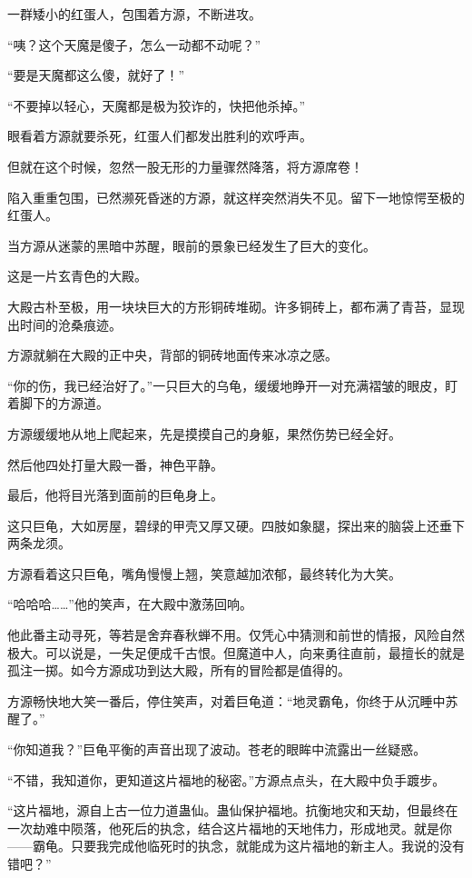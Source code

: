
\begin{this_body}

一群矮小的红蛋人，包围着方源，不断进攻。

“咦？这个天魔是傻子，怎么一动都不动呢？”

“要是天魔都这么傻，就好了！”

“不要掉以轻心，天魔都是极为狡诈的，快把他杀掉。”

眼看着方源就要杀死，红蛋人们都发出胜利的欢呼声。

但就在这个时候，忽然一股无形的力量骤然降落，将方源席卷！

陷入重重包围，已然濒死昏迷的方源，就这样突然消失不见。留下一地惊愕至极的红蛋人。

当方源从迷蒙的黑暗中苏醒，眼前的景象已经发生了巨大的变化。

这是一片玄青色的大殿。

大殿古朴至极，用一块块巨大的方形铜砖堆砌。许多铜砖上，都布满了青苔，显现出时间的沧桑痕迹。

方源就躺在大殿的正中央，背部的铜砖地面传来冰凉之感。

“你的伤，我已经治好了。”一只巨大的乌龟，缓缓地睁开一对充满褶皱的眼皮，盯着脚下的方源道。

方源缓缓地从地上爬起来，先是摸摸自己的身躯，果然伤势已经全好。

然后他四处打量大殿一番，神色平静。

最后，他将目光落到面前的巨龟身上。

这只巨龟，大如房屋，碧绿的甲壳又厚又硬。四肢如象腿，探出来的脑袋上还垂下两条龙须。

方源看着这只巨龟，嘴角慢慢上翘，笑意越加浓郁，最终转化为大笑。

“哈哈哈……”他的笑声，在大殿中激荡回响。

他此番主动寻死，等若是舍弃春秋蝉不用。仅凭心中猜测和前世的情报，风险自然极大。可以说是，一失足便成千古恨。但魔道中人，向来勇往直前，最擅长的就是孤注一掷。如今方源成功到达大殿，所有的冒险都是值得的。

方源畅快地大笑一番后，停住笑声，对着巨龟道：“地灵霸龟，你终于从沉睡中苏醒了。”

“你知道我？”巨龟平衡的声音出现了波动。苍老的眼眸中流露出一丝疑惑。

“不错，我知道你，更知道这片福地的秘密。”方源点点头，在大殿中负手踱步。

“这片福地，源自上古一位力道蛊仙。蛊仙保护福地。抗衡地灾和天劫，但最终在一次劫难中陨落，他死后的执念，结合这片福地的天地伟力，形成地灵。就是你——霸龟。只要我完成他临死时的执念，就能成为这片福地的新主人。我说的没有错吧？”


\end{this_body}
